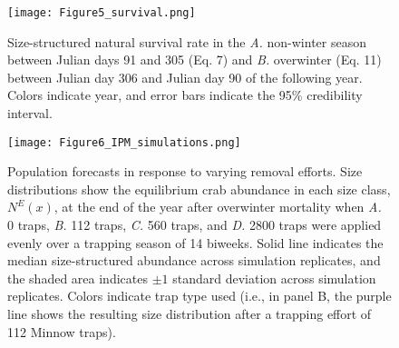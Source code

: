 \documentclass{article}
\begin{document}
\begin{figure}[H]
    \centering
    \texttt{[image: Figure5\_survival.png]}
    \caption{Size-structured natural survival rate in the \textit{A.} non-winter season between Julian days 91 and 305 (Eq. 7) and \textit{B.} overwinter (Eq. 11) between Julian day 306 and Julian day 90 of the following year. Colors indicate year, and error bars indicate the 95\% credibility interval.}
\end{figure}

\begin{figure}[H]
    \centering
    \texttt{[image: Figure6\_IPM\_simulations.png]}
    \caption{Population forecasts in response to varying removal efforts. Size distributions show the equilibrium crab abundance in each size class, $N^E(x)$, at the end of the year after overwinter mortality when \textit{A.} 0 traps, \textit{B.} 112 traps, \textit{C.} 560 traps, and \textit{D.} 2800 traps were applied evenly over a trapping season of 14 biweeks. Solid line indicates the median size-structured abundance across simulation replicates, and the shaded area indicates $\pm1$ standard deviation across simulation replicates. Colors indicate trap type used (i.e., in panel B, the purple line shows the resulting size distribution after a trapping effort of 112 Minnow traps).}
\end{figure}


\printbibliography[]
\end{document}
